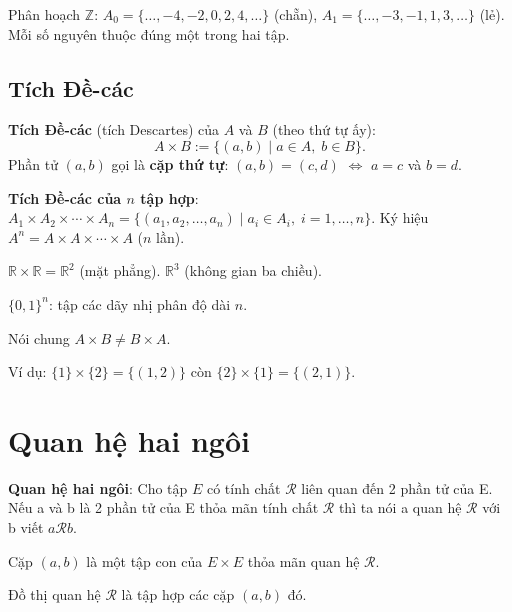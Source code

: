 \documentclass[12pt,a4paper]{article}
\begin{document}
\begin{vidu}
  Phân hoạch $\mathbb{Z}$: $A_0 = \{\ldots, -4, -2, 0, 2, 4, \ldots\}$ (chẵn), $A_1 = \{\ldots, -3, -1, 1, 3, \ldots\}$ (lẻ). Mỗi số nguyên thuộc đúng một trong hai tập.
\end{vidu}

\subsection{Tích Đề-các}

\begin{dinhnghia}
  \textbf{Tích Đề-các} (tích Descartes) của $A$ và $B$ (theo thứ tự ấy):
  \[
    A \times B := \{(a, b) \mid a \in A,\; b \in B\}.
  \]
  Phần tử $(a, b)$ gọi là \textbf{cặp thứ tự}: $(a, b) = (c, d)$ $\Leftrightarrow$ $a = c$ và $b = d$.
\end{dinhnghia}

\begin{dinhnghia}
  \textbf{Tích Đề-các của $n$ tập hợp}: $A_1 \times A_2 \times \cdots \times A_n = \{(a_1, a_2, \ldots, a_n) \mid a_i \in A_i,\; i = 1, \ldots, n\}$. Ký hiệu $A^n = A \times A \times \cdots \times A$ ($n$ lần).
\end{dinhnghia}

\begin{vidu}
  $\mathbb{R} \times \mathbb{R} = \mathbb{R}^2$ (mặt phẳng). $\mathbb{R}^3$ (không gian ba chiều). 
  
  $\{0,1\}^n$: tập các dãy nhị phân độ dài $n$.
\end{vidu}

\begin{luuy}
  Nói chung $A \times B \ne B \times A$. 
  
  Ví dụ: $\{1\} \times \{2\} = \{(1,2)\}$ còn $\{2\} \times \{1\} = \{(2,1)\}$.
\end{luuy}

\section{Quan hệ hai ngôi}

\begin{dinhnghia}
  \textbf{Quan hệ hai ngôi}: Cho tập $E$ có tính chất $\mathcal{R}$ liên quan đến 2 phần tử của E. Nếu a và b là 2 phần tử của E thỏa mãn tính chất $\mathcal{R}$ thì ta nói a quan hệ $\mathcal{R}$ với b viết $a\mathcal{R}b$.

  Cặp $(a, b)$ là một tập con của $E \times E$ thỏa mãn quan hệ $\mathcal{R}$.

  Đồ thị quan hệ $\mathcal{R}$ là tập hợp các cặp $(a, b)$ đó.
\end{dinhnghia}
\end{document}
